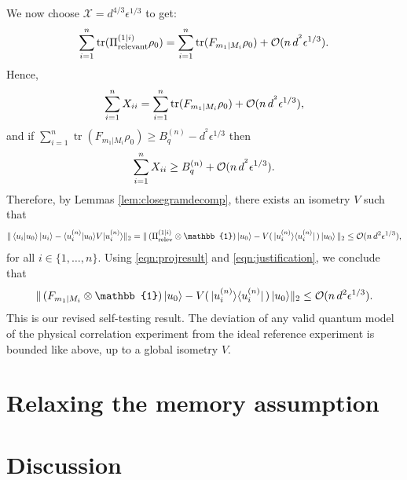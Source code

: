 We now choose $\mathcal{X}=d^{4/3}\epsilon^{1/3}$ to get:
\begin{equation*}
\sum_{i=1}^n\operatorname{tr}(\Pi_{\text{relevant}}^{(1\vert i)}\rho_0) = \sum_{i=1}^n\operatorname{tr}(F_{m_1\vert M_i}\rho_0)+\mathcal{O}(n\thinspace d^{^2}\epsilon^{1/3}).
\end{equation*}
Hence,
\begin{equation*}
\sum_{i=1}^n X_{ii} = \sum_{i=1}^n\operatorname{tr}(F_{m_1\vert M_i}\rho_0)+\mathcal{O}(n\thinspace d^{^2}\epsilon^{1/3}),
\end{equation*}
and if $\sum_{i=1}^n \operatorname{tr}(F_{m_1\vert M_i}\rho_0)\geq B_q^{(n)}-d^{^2}\epsilon^{1/3}$ then
\begin{equation*}
\sum_{i=1}^n X_{ii} \geq B_q^{(n)}+\mathcal{O}(n \thinspace d^{^2}\epsilon^{1/3}).
\end{equation*}
Therefore, by Lemmas \ref{lem:closegramdecomp}, there exists an isometry $V$ such that
\begin{equation*}
\|\bra{u_i}\ket{u_0}\ket{u_i}-\langle u_i^{(n)}\vert u_0\rangle V \vert u_i^{(n)} \rangle \|_2 = \|\thinspace(\Pi_{\text{relev}}^{(1\vert i)}\otimes \mathbb{1})\ket{u_0}-V(\thinspace\vert u_i^{(n)}\rangle \langle u_i^{(n)} \vert\thinspace)\thinspace\vert u_0 \rangle \thinspace\|_2 \leq \mathcal{O}(n\thinspace d^2\epsilon^{1/3}),
\end{equation*}
for all $i \in \{1,\dots,n\}$.
Using \ref{eqn:projresult} and \ref{eqn:justification}, we conclude that
\begin{equation*}
\|\thinspace (F_{m_1\vert M_i}\otimes \mathbb{1})\ket{u_0}-V(\thinspace\vert u_i^{(n)}\rangle \langle u_i^{(n)} \vert\thinspace)\thinspace \vert u_0 \rangle \|_2 \leq \mathcal{O}(n \thinspace d^2\epsilon^{1/3}).
\end{equation*}
This is our revised self-testing result. The deviation of any valid quantum model of the physical correlation experiment from the ideal reference experiment is bounded like above, up to a global isometry $V$.

\section{Relaxing the memory assumption}
\label{sec:relaxmemoryass}


\section{Discussion}
\label{sec:discussion}